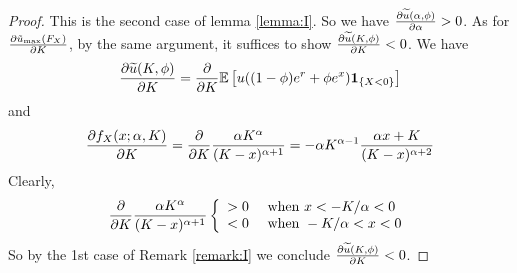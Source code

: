 \documentclass[11pt,a4]{amsart}
\newcommand{\pd}{\partial}
\newcommand{\wt}{\widetilde}
\newcommand{\E }{{\mathbb E}}
\newcommand{\1}{{\mathbf 1}}
\begin{document}
\begin{proof}
  This is the second case of lemma \ref{lemma:I}. So we have
  ${\pd \wt u(\alpha, \phi) \over \pd \alpha} > 0$.
  As for ${\pd \tilde u_{\rm max}(F_X) \over \pd K}$, by the same
  argument, it suffices to show ${\pd \wt u(K, \phi) \over \pd K} < 0$.
  We have
  \[
  {\pd \wt u(K, \phi) \over \pd K}
  = {\partial \over \partial K} \E \left[
    u((1 - \phi) e^r + \phi e^x) \1_{\{X < 0\}}
  \right] 
  \]
  and
  \begin{eqnarray*}
    {\pd f_X(x; \alpha, K) \over \pd K}
    = {\partial \over \partial K} {\alpha K^\alpha \over (K - x)^{\alpha + 1}}
   = -\alpha K^{\alpha - 1} {
      \alpha x + K
      \over
      (K - x)^{\alpha + 2}
    }
  \end{eqnarray*}
  Clearly,
  \[
  {\partial \over \partial K}
  {\alpha K^\alpha \over (K - x)^{\alpha + 1}}
  \left\{
    \begin{array}{ll}
      > 0 & \text{ when } x < -K/\alpha < 0\\
      < 0 & \text{ when } -K/\alpha < x < 0
    \end{array}
  \right.
  \]
  So by the 1st case of Remark \ref{remark:I} we conclude $  {\pd \wt u(K, \phi) \over \pd K} < 0$.
\end{proof}
\end{document}
